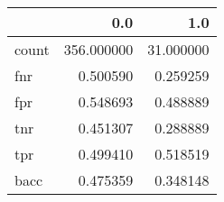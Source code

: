 \begin{tabular}{lrr}
\toprule
{} &         0.0 &        1.0 \\
\midrule
count &  356.000000 &  31.000000 \\
fnr   &    0.500590 &   0.259259 \\
fpr   &    0.548693 &   0.488889 \\
tnr   &    0.451307 &   0.288889 \\
tpr   &    0.499410 &   0.518519 \\
bacc  &    0.475359 &   0.348148 \\
\bottomrule
\end{tabular}
